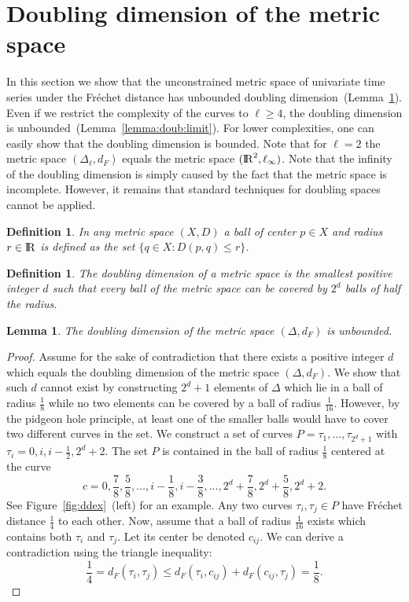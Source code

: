 \documentclass[11pt, letter]{article}
\newtheorem{definition}[theorem]{Definition}
\newtheorem{lemma}[theorem]{Lemma}
\newcommand{\lemref}[1]{Lemma~\ref{lemma:#1}}
\newcommand{\figref}[1]{Figure~\ref{fig:#1}}
\newcommand{\Frechet}{Fr\'echet\xspace}
\providecommand{\pth}[2][\!]{#1\left({#2}\right)}
\renewcommand{\Re}{{\rm I\!\hspace{-0.025em} R}}
\newcommand{\distFr}[2]{\ensuremath{d_F\pth{#1,#2}}}
\begin{document}
\section{Doubling dimension of the metric space}
\label{section:doublingdimension}


In this section we show that the unconstrained metric space of univariate time series 
under the \Frechet distance has unbounded doubling dimension~(\lemref{doub:unlimit}).
Even if we restrict the complexity of the curves 
to $\ell\geq 4$, the 
doubling dimension is unbounded~(\lemref{doub:limit}). 
For lower complexities, one can easily
show that the doubling dimension is bounded. Note that for $\ell=2$ the 
metric space $(\Delta_\ell, d_F)$ equals the metric space $(\Re^2,\ell_{\infty})$. 
Note that the infinity of the doubling dimension is simply caused by the fact that the
metric space is incomplete. However, it remains that standard techniques for
doubling spaces cannot be applied.


\begin{definition}
In any metric space $(X,D)$ a ball of center $p\in X$ and radius $r\in \Re$  is defined as the set
$\{q\in X : D(p,q) \leq r\}$.
\end{definition}

\begin{definition}
The doubling dimension of a metric space is the smallest positive integer $d$
such that every ball of the metric space can be covered by $2^d$ balls of half
the radius. 
\end{definition}


\begin{lemma}
\label{lemma:doub:unlimit}
The doubling dimension of the metric space $(\Delta, d_F)$ is unbounded.
\end{lemma}

\begin{proof}
Assume for the sake of contradiction that there exists a positive integer $d$
which equals the doubling dimension of the metric space $(\Delta, d_F)$.  We
show that such $d$ cannot exist by constructing $2^d+1$ elements of
$\Delta$ which lie in a ball of radius $\frac{1}{8}$ while no two elements can be
covered by a ball of radius $\frac{1}{16}$.  However, by the pidgeon hole principle, at
least one of the smaller balls would have to cover two different curves in the set. 
We construct a set of curves
$P=\tau_{1},\dots,\tau_{2^d+1}$ with $\tau_i=0,i,i-\frac{1}{2},2^d+2$. The set
$P$ is contained in the ball of radius $\frac{1}{8}$ centered at the curve
\[c=0,\frac{7}{8}, \frac{5}{8}, \dots,i-\frac{1}{8},i-\frac{3}{8}, \dots,
2^d+\frac{7}{8}, 2^d+\frac{5}{8}, 2^d+2.\] See \figref{ddex}~(left) for an example.
Any two curves $\tau_i,\tau_j \in P$
have \Frechet distance $\frac{1}{4}$ to each other.  Now, assume that a ball of
radius $\frac{1}{16}$ exists which contains both $\tau_i$ and $\tau_j$. Let 
its center be denoted $c_{ij}$. We can derive a contradiction using the triangle inequality:
\[\frac{1}{4}=\distFr{\tau_i}{\tau_j}\leq \distFr{\tau_i}{c_{ij}} +\distFr{c_{ij}}{\tau_j}=\frac{1}{8}. \]
\end{proof}
\end{document}
